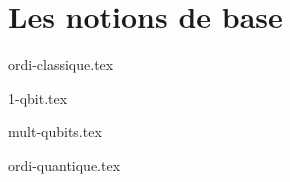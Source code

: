 \part{Les notions de base}\label{part:les-notions-de-base}

{ordi-classique.tex}

{1-qbit.tex}

{mult-qubits.tex}

{ordi-quantique.tex}